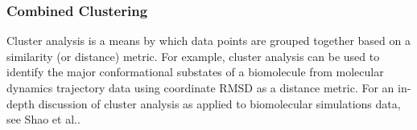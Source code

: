

\subsubsection*{Combined Clustering}


Cluster analysis is a means by which data points are grouped together based on a similarity (or distance) metric. For example, cluster analysis can be used to identify the major conformational substates of a biomolecule from molecular dynamics trajectory data using coordinate RMSD as a distance metric. For an in-depth discussion of cluster analysis as applied to biomolecular simulations data, see Shao et al.\citep{Shao2007}. 

